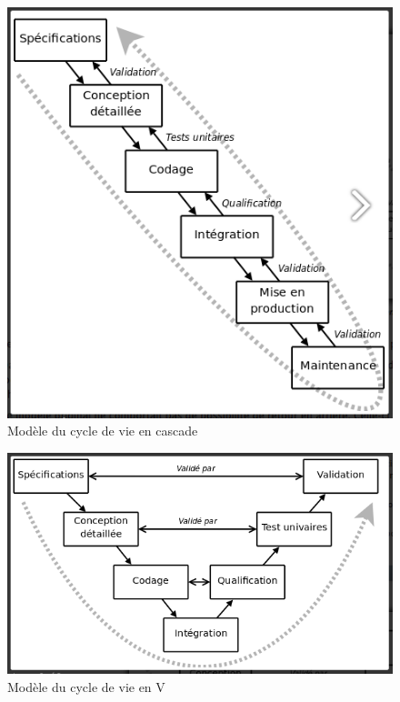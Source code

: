     \begin{figure}[t]
        \centering
        \includegraphics[scale=0.35]{images/Analyse_des_besoins/methcasc.png}
        \caption{Modèle du cycle de vie en cascade \cite{audibert2009uml}}
        \label{fig:methv}
    \end{figure}
    \begin{figure}[t]
        \centering
        \includegraphics[scale=0.35]{images/Analyse_des_besoins/methv.png}
        \caption{Modèle du cycle de vie en V \cite{audibert2009uml}}
        \label{fig:methv2}
    \end{figure}
